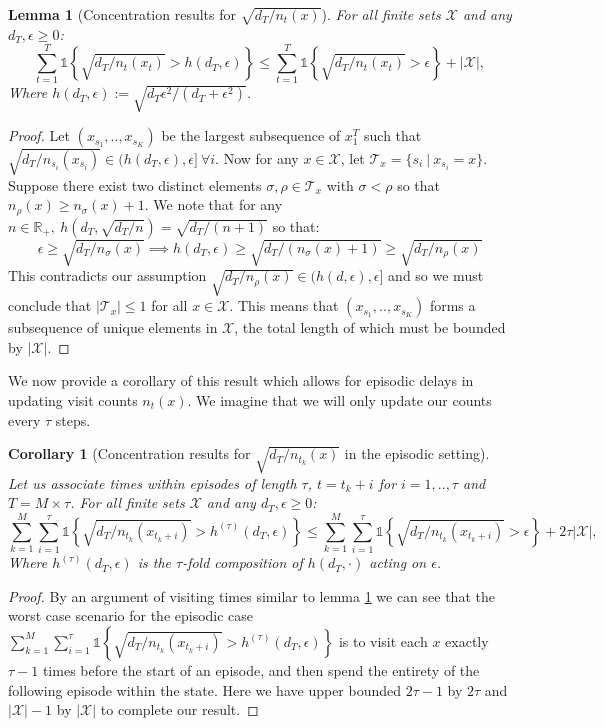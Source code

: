 \documentclass{article}
\newtheorem{corollary}{Corollary}
\newtheorem{lemma}{Lemma}
\newcommand{\Real}{\mathds{R}}
\newcommand{\Ind}{\mathds{1}}
\newcommand{\Xc}{\mathcal{X}}
\begin{document}
\begin{lemma}[Concentration results for $\sqrt{d_T / n_t(x)}$]
\label{lem: rad} \hspace{0.000000001mm} \newline
For all finite sets $\Xc$ and any $d_T, \epsilon \ge 0$:
$$\sum_{t=1}^T \Ind \left\{ \sqrt{ d_T / n_t(x_t) } > h(d_T,\epsilon) \right\} \le
	\sum_{t=1}^T \Ind \left\{ \sqrt{ d_T/n_t(x_t) } > \epsilon \right\} + |\Xc|,$$
Where $h(d_T, \epsilon) := \sqrt{d_T \epsilon^2 / (d_T + \epsilon^2)}$.
\end{lemma}
\begin{proof}
Let $(x_{s_1},..,x_{s_K})$ be the largest subsequence of $x^T_1$ such that $\sqrt{d_T / n_{s_i}(x_{s_i})}\in ( h(d_T,\epsilon), \epsilon] \ \forall i$.
Now for any $x \in \Xc$, let $\mathcal{T}_x = \{ s_i \ | \ x_{s_i} = x \}$.
Suppose there exist two distinct elements $\sigma, \rho \in \mathcal{T}_x$ with $\sigma < \rho$ so that $n_\rho(x) \ge n_\sigma(x) + 1$.
We note that for any $n \in \Real_+, \  h(d_T, \sqrt{d_T / n}) = \sqrt{d_T / (n+1)}$ so that:
$$ \epsilon \ge \sqrt{ d_T / n_\sigma(x) } \implies h(d_T, \epsilon) \ge \sqrt{ d_T / (n_\sigma(x) + 1) } \ge \sqrt{ d_T / n_\rho(x) } $$
This contradicts our assumption $\sqrt{d_T / n_\rho(x)} \in ( h(d,\epsilon), \epsilon]$ and so we must conclude that $| \mathcal{T}_x| \le 1$ for all $ x \in \Xc$.
This means that $(x_{s_1},..,x_{s_K})$ forms a subsequence of unique elements in $\Xc$, the total length of which must be bounded by $| \Xc | $.
\end{proof}

We now provide a corollary of this result which allows for episodic delays in updating visit counts $n_t(x)$.
We imagine that we will only update our counts every $\tau$ steps.

\begin{corollary}[Concentration results for $\sqrt{d_T / n_{t_k}(x)}$ in the episodic setting]
\label{cor: rad ep} \hspace{0.000000001mm} \newline
Let us associate times within episodes of length $\tau$, $t = t_k+i$ for $i=1,..,\tau$ and $T = M \times \tau$.
For all finite sets $\Xc$ and any $d_T, \epsilon \ge 0$:
$$\sum_{k=1}^M \sum_{i=1}^\tau \Ind \left\{ \sqrt{ d_T / n_{t_k}(x_{t_k+i}) } > h^{(\tau)}(d_T,\epsilon) \right\} \le
	\sum_{k=1}^M \sum_{i=1}^\tau  \Ind \left\{ \sqrt{ d_T / n_{t_k}(x_{t_k+i}) } > \epsilon \right\} + 2\tau |\Xc|,$$
Where $h^{(\tau)}(d_T,\epsilon)$ is the $\tau$-fold composition of $h(d_T,\cdot)$ acting on $\epsilon$.
\end{corollary}
\begin{proof}
By an argument of visiting times similar to lemma \ref{lem: rad} we can see that the worst case scenario for the episodic case $\sum_{k=1}^M \sum_{i=1}^\tau \Ind \left\{ \sqrt{ d_T / n_{t_k}(x_{t_k+i}) } > h^{(\tau)}(d_T,\epsilon) \right\}$ is to visit each $x$ exactly $\tau-1$ times before the start of an episode, and then spend the entirety of the following episode within the state.
Here we have upper bounded $2\tau-1$ by $2\tau$ and $|\Xc|-1$ by $|\Xc|$ to complete our result.
\end{proof}
\end{document}
